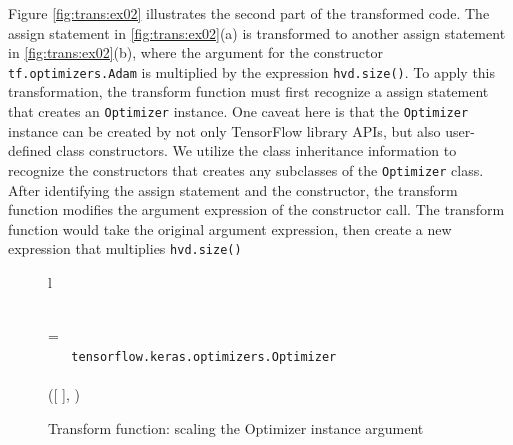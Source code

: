 Figure \ref{fig:trans:ex02} illustrates the second part of the transformed code.
The assign statement in \ref{fig:trans:ex02}(a) is transformed to
another assign statement in \ref{fig:trans:ex02}(b), where the argument for the
constructor {\tt tf.optimizers.Adam} is multiplied by the expression
{\tt hvd.size()}. 
To apply this transformation, the transform function must first recognize a
assign statement that creates an {\tt Optimizer} instance.
One caveat here is that the {\tt Optimizer} instance can be 
created by not only TensorFlow library APIs, but also
user-defined class constructors. We utilize the class inheritance information to
recognize the constructors that creates any subclasses of the {\tt Optimizer}
class. 
After identifying the assign statement and the constructor, 
the transform function modifies the argument expression of the
constructor call.
The transform function would take the original argument expression,
then create a new expression that multiplies {\tt hvd.size()}

\begin{figure}[ht!]
  \centering
  \begin{tabular}{l}

  \\

   = \\

  \inden \ktif ~  \ktsubtysubs{\smodenv} ~ {\tt tensorflow.keras.optimizers.Optimizer}\\
  \inden \ktthen \\

  \inden\inden ([ \oassign {} ], )\\

  \end{tabular}
  \caption{Transform function: scaling the Optimizer instance argument}
  \label{fig:trans:fn02}
\end{figure}

